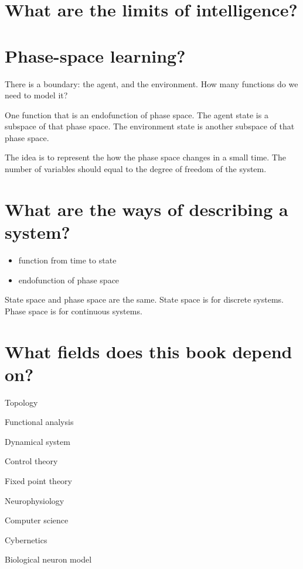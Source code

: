 \section{What are the limits of intelligence?}

\section{Phase-space learning?}

There is a boundary: the agent, and the environment.
How many functions do we need to model it?

One function that is an endofunction of phase space.
The agent state is a subspace of that phase space.
The environment state is another subspace of that phase space.

The idea is to represent the how the phase space changes in a small time.
The number of variables should equal to the degree of freedom of the system.

\section{What are the ways of describing a system?}

\begin{itemize}
    \item function from time to state
    \item endofunction of phase space
\end{itemize}

State space and phase space are the same.
State space is for discrete systems.
Phase space is for continuous systems.

\section{What fields does this book depend on?}

Topology \cite{Topology}

Functional analysis

Dynamical system

Control theory

Fixed point theory

Neurophysiology

Computer science

Cybernetics


Biological neuron model

